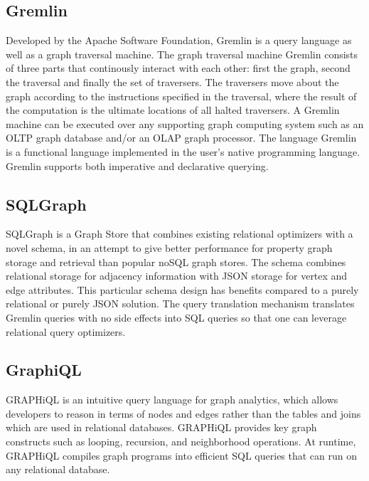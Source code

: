 \documentclass[11pt,singlecolumn]{scrartcl}
\begin{document}
\subsection{Gremlin}
Developed by the Apache Software Foundation, Gremlin is a query language as well as a graph traversal machine. The graph traversal machine Gremlin consists of three parts that continously interact with each other: first the graph, second the traversal and finally the set of traversers. The traversers move about the graph according to the instructions specified in the traversal, where the result of the computation is the ultimate locations of all halted traversers. A Gremlin machine can be executed over any supporting graph computing system such as an OLTP graph database and/or an OLAP graph processor. The language Gremlin is a functional language implemented in the user’s native programming language. Gremlin supports both imperative and declarative querying.
\cite{Gremlin}


\subsection{SQLGraph}
SQLGraph is a Graph Store that combines existing relational optimizers with a novel schema, in an attempt to give better performance for property graph storage and retrieval than popular noSQL graph stores. The schema combines relational storage for adjacency information with JSON storage for vertex and edge attributes. This particular schema design has benefits compared to a purely relational or purely JSON solution. The query translation mechanism translates Gremlin queries with no side effects into SQL queries so that one can leverage relational query optimizers. \cite{Sun:2015}


\subsection{GraphiQL}
GRAPHiQL is an intuitive query language for graph analytics, which allows developers to reason in terms of nodes and edges rather than the tables and joins which are used in relational databases. GRAPHiQL provides key graph constructs such as looping, recursion, and neighborhood operations. At runtime, GRAPHiQL compiles graph programs into efficient SQL queries that can run on any relational database. \cite {Graphiql}
\clearpage
\end{document}
